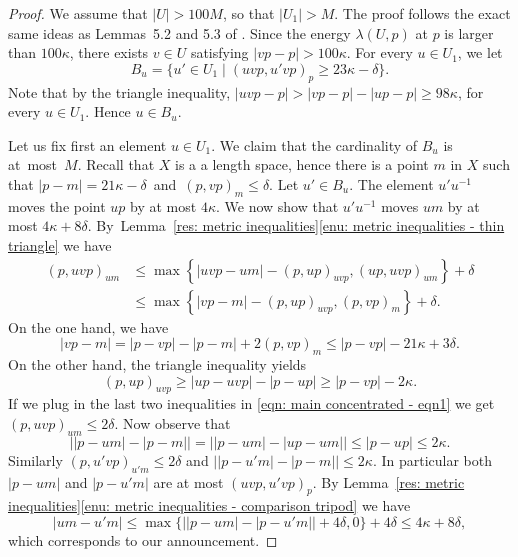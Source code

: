 \begin{proof}
We assume that $|U| > 100M$, so that $|U_1| > M$.
The proof follows the exact same ideas as Lemmas~5.2 and 5.3 of \cite{delzant_product_2020}.
Since the energy $\lambda(U,p)$ at $p$ is larger than $100\kappa$, there exists $v \in U$ satisfying $|vp - p| > 100\kappa$.
For every $u \in U_1$, we let
\begin{equation*}
B_u =\{ u' \in U_1 \mid (uvp, u'vp)_p \geq 23\kappa - \delta\}.
\end{equation*}
Note that by the triangle inequality, $|uvp - p| > |vp - p| - |up - p| \geq 98\kappa$, for every $u \in U_1$.
Hence $u \in B_u$.

Let us fix first an element $u \in U_1$.
We claim that the cardinality of $B_u$ is at~most~$M$.
Recall that $X$ is a a length space, hence there is a point $m$ in $X$ such that \hbox{$|p - m | = 21\kappa - \delta$ and $(p,vp)_m \leq \delta$}.
Let $u' \in B_u$.
The element $u'u^{-1}$ moves the point $up$ by at most $4\kappa$.
We now show that $u'u^{-1}$ moves $um$ by at most $4\kappa + 8\delta$.
By~Lemma~\ref{res: metric inequalities}\eqref{enu: metric inequalities - thin triangle} we have
\begin{equation}
\begin{split}
(p, uvp)_{um}
& \leq \max\left\{|uvp - um| - (p,up)_{uvp}, (up,uvp)_{um}\right\} + \delta \\
& \leq \max\left\{|vp - m| - (p,up)_{uvp}, (p,vp)_{m}\right\} + \delta.
\end{split}
\label{eqn: main concentrated - eqn1}
\end{equation}
On the one hand, we have
\begin{equation*}
|vp - m| = |p - vp| - |p - m| + 2 (p,vp)_m \leq |p - vp| - 21 \kappa + 3\delta.
\end{equation*}
On the other hand, the triangle inequality yields
\begin{equation*}
(p,up)_{uvp} \geq |up - uvp| - |p - up| \geq |p - vp| - 2\kappa.
\end{equation*}
If we plug in the last two inequalities in \eqref{eqn: main concentrated - eqn1} we get $(p, uvp)_{um} \leq 2 \delta$.
Now observe that
\begin{equation*}
\bigl||p-um| - |p - m| \bigr| = \bigl||p-um| - |up - um| \bigr| \leq |p- up| \leq 2\kappa.
\end{equation*}
Similarly $(p, u'vp)_{u'm} \leq 2 \delta$ and $\bigl||p-u'm| - |p - m| \bigr| \leq 2\kappa$.
In particular both $|p - um|$ and $|p - u'm|$ are at most $(uvp,u'vp)_p$.
By Lemma~\ref{res: metric inequalities}\eqref{enu: metric inequalities - comparison tripod} we have
\begin{equation*}
|um - u'm| \leq \max \bigl\{ \bigl||p-um| - |p - u'm| \bigr| + 4 \delta, 0 \bigr\}+ 4\delta
\leq 4\kappa + 8\delta,
\end{equation*}
which corresponds to our announcement.


\end{proof}
